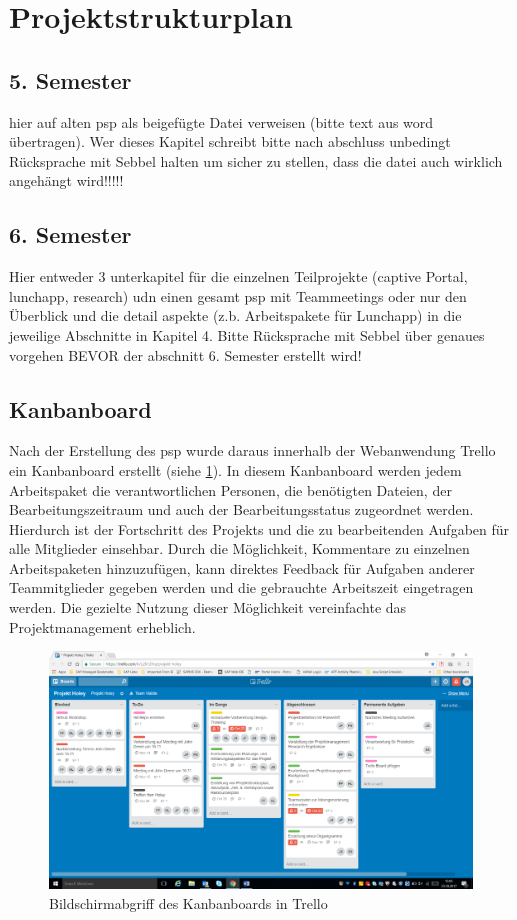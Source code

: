 \section{Projektstrukturplan}

\subsection{5. Semester}

hier auf alten psp als beigefügte Datei verweisen (bitte text aus word übertragen). Wer dieses Kapitel schreibt bitte nach abschluss unbedingt Rücksprache mit Sebbel halten um sicher zu stellen, dass die datei auch wirklich angehängt wird!!!!!

\subsection{6. Semester}

Hier entweder 3 unterkapitel für die einzelnen Teilprojekte (captive Portal, lunchapp, research) udn einen gesamt psp mit Teammeetings oder nur den Überblick und die detail aspekte (z.b. Arbeitspakete für Lunchapp) in die jeweilige Abschnitte in Kapitel 4. Bitte Rücksprache mit Sebbel über genaues vorgehen BEVOR der abschnitt 6. Semester erstellt wird!


\subsection{Kanbanboard}

Nach der Erstellung des \gls{psp} wurde daraus innerhalb der Webanwendung Trello ein Kanbanboard erstellt (siehe \ref{fig:frame:kanban}). In diesem Kanbanboard werden jedem Arbeitspaket die verantwortlichen Personen, die benötigten Dateien, der Bearbeitungszeitraum und auch der Bearbeitungsstatus zugeordnet werden. Hierdurch ist der Fortschritt des Projekts und die zu bearbeitenden Aufgaben für alle Mitglieder einsehbar. Durch die Möglichkeit, Kommentare zu einzelnen Arbeitspaketen hinzuzufügen, kann direktes Feedback für Aufgaben anderer Teammitglieder gegeben werden und die gebrauchte Arbeitszeit eingetragen werden. Die gezielte Nutzung dieser Möglichkeit vereinfachte das Projektmanagement erheblich.

\begin{figure}[H]
\centering
\includegraphics[width=1\textwidth]{images/trello}
\caption[Bildschirmabgriff des Kanbanboards in Trello]{Bildschirmabgriff des Kanbanboards in Trello}
\label{fig:frame:kanban}
\end{figure}
